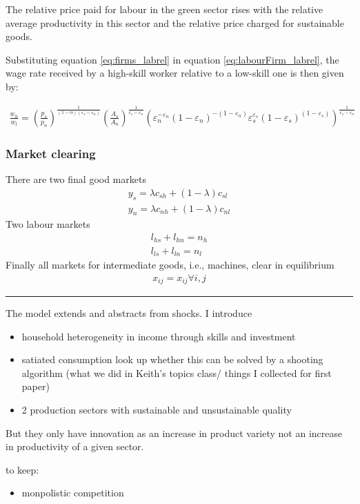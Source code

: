 The relative price paid for labour in the green sector rises with the relative average productivity in this sector and the relative price charged for sustainable goods. 

Substituting equation  \ref{eq:firms_labrel}  in equation \ref{eq:labourFirm_labrel},
the wage rate received by a high-skill worker relative to a low-skill one is then given by:

\begin{align}
\frac{w_h}{w_l}=\left(\frac{p_s}{p_n}\right)^\frac{1}{(1-\alpha)(\varepsilon_s-\varepsilon_n)} \left(\frac{A_s}{A_n}\right)^\frac{1}{\varepsilon_s-\varepsilon_n}\left(\varepsilon_n^{-\varepsilon_n} (1-\varepsilon_n)^{-(1-\varepsilon_n)}\varepsilon_s^{\varepsilon_s} (1-\varepsilon_s)^{(1-\varepsilon_s)} \right)^\frac{1}{\varepsilon_s-\varepsilon_n}
\end{align}


\subsubsection{Market clearing}
There are two final good markets
\begin{align*}
y_s=\lambda c_{sh}+(1-\lambda) c_{sl}\\
y_n=\lambda c_{nh}+(1-\lambda) c_{nl}
\end{align*}
Two labour markets
\begin{align*}
l_{hs}+l_{hn}=n_h\\
l_{ls}+l_{ln}=n_l
\end{align*}
Finally all markets for intermediate goods, i.e., machines, clear in equilibrium
\begin{align*}
x_{ij}=x_{ij} \forall i,j
\end{align*}


\vspace{5mm}
\noindent\rule[1ex]{\textwidth}{1pt}
The model extends \cite{Bilbiie2012EndogenousCycles} and abstracts from shocks. 
I introduce
\begin{itemize}
\item household heterogeneity in income through skills and investment
\item satiated consumption \ar look up whether this can be solved by a shooting algorithm (what we did in Keith's topics class/ things I collected for first paper)
\item 2 production sectors with sustainable and unsustainable quality
\end{itemize}

But they only have innovation as an increase in product variety not an increase in productivity of a given sector.

to keep:
\begin{itemize}
\item monpolistic competition
\end{itemize}

